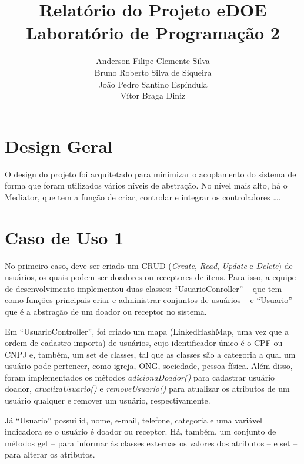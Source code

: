 \documentclass[journal,12pt,onecolumn,draftclsnofoot,]{article}
\begin{document}
	
	\title{Relatório do Projeto eDOE \\ Laboratório de Programação 2}
	\author{Anderson Filipe Clemente Silva \\
			Bruno Roberto Silva de Siqueira \\
			João Pedro Santino Espíndula \\
			Vítor Braga Diniz}
	
	\maketitle
	\newpage
	
	\tableofcontents
	
	\newpage
	
	\section{Design Geral}
	O design do projeto foi arquitetado para minimizar o acoplamento do sistema de forma que foram utilizados vários níveis de abstração. No nível mais alto, há o Mediator, que tem a função de criar, controlar e integrar os controladores ….	
	
	\section{Caso de Uso 1}
	No primeiro caso, deve ser criado um CRUD (\textit{Create}, \textit{Read}, \textit{Update} e \textit{Delete}) de usuários, os quais podem ser doadores ou receptores de itens. Para isso, a equipe de desenvolvimento implementou duas classes: “UsuarioConroller” -- que tem como funções principais criar e administrar conjuntos de usuários -- e “Usuario” -- que é a abstração de um doador ou receptor no sistema.
	
	Em “UsuarioController”,  foi criado um mapa (LinkedHashMap, uma vez que a ordem de cadastro importa) de usuários, cujo identificador único é o CPF ou CNPJ e, também, um set de classes, tal que as classes são a categoria a qual um usuário pode pertencer, como igreja, ONG, sociedade, pessoa física. Além disso, foram implementados os métodos \textit{adicionaDoador()} para cadastrar usuário doador, \textit{atualizaUsuario()} e \textit{removeUsuario()} para atualizar os atributos de um usuário qualquer e remover um usuário, respectivamente.
	
	Já “Usuario” possui id, nome, e-mail, telefone, categoria e uma variável indicadora se o usuário é doador ou receptor. Há, também, um conjunto de métodos get -- para informar às classes externas os valores dos atributos -- e set -- para alterar os atributos.
			
\end{document}
